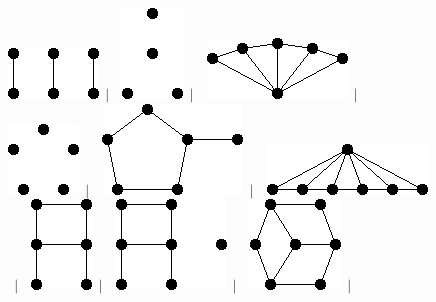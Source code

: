 \documentclass[11pt,paper=b5,footinclude,headinclude]{scrbook} %
\newtheorem{ex}{Vaja\hypertarget{sol:\theex}}[chapter]
\begin{document}
\begin{ex}
\begin{figure}
\includegraphics[scale=0.5]{smallGraphs/g_3K2.png}$\,\mid\,$\
\includegraphics[scale=0.5]{smallGraphs/g_4K1.png}$\,\mid\,$\
\includegraphics[scale=0.5]{smallGraphs/g_4fan.png}$\,\mid\,$\
\includegraphics[scale=0.5]{smallGraphs/g_5K1.png}$\,\mid\,$\
\includegraphics[scale=0.5]{smallGraphs/g_5pan.png}$\,\mid\,$\
\includegraphics[scale=0.5]{smallGraphs/g_6fan.png}$\,\mid\,$\
\includegraphics[scale=0.5]{smallGraphs/g_A.png}$\,\mid\,$\
\includegraphics[scale=0.5]{smallGraphs/g_AUK1.png}$\,\mid\,$\
\includegraphics[scale=0.5]{smallGraphs/g_BW3.png}$\,\mid\,$\

\end{figure}
\end{ex}
\end{document}

